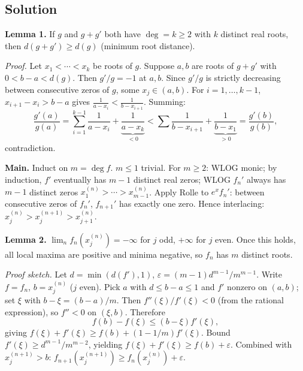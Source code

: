 \documentclass{article}
\begin{document}
\subsection*{Solution}
\textbf{Lemma 1.} If $g$ and $g + g'$ both have $\deg = k \ge 2$ with $k$ distinct real roots, then $d(g + g') \ge d(g)$ (minimum root distance).

\emph{Proof.} Let $x_1 < \cdots < x_k$ be roots of $g$. Suppose $a, b$ are roots of $g + g'$ with $0 < b - a < d(g)$. Then $g'/g = -1$ at $a, b$. Since $g'/g$ is strictly decreasing between consecutive zeros of $g$, some $x_j \in (a, b)$. For $i = 1, \ldots, k-1$, $x_{i+1} - x_i > b - a$ gives $\tfrac{1}{a - x_i} < \tfrac{1}{b - x_{i+1}}$. Summing:
\[
\frac{g'(a)}{g(a)} = \sum_{i=1}^{k-1} \frac{1}{a - x_i} + \underbrace{\frac{1}{a - x_k}}_{< 0} < \sum \frac{1}{b - x_{i+1}} + \underbrace{\frac{1}{b - x_1}}_{> 0} = \frac{g'(b)}{g(b)},
\]
contradiction.

\textbf{Main.} Induct on $m = \deg f$. $m \le 1$ trivial. For $m \ge 2$: WLOG monic; by induction, $f'$ eventually has $m-1$ distinct real zeros; WLOG $f_n'$ always has $m - 1$ distinct zeros $x_1^{(n)} > \cdots > x_{m-1}^{(n)}$. Apply Rolle to $e^x f_n'$: between consecutive zeros of $f_n'$, $f_{n+1}'$ has exactly one zero. Hence interlacing: $x_j^{(n)} > x_j^{(n+1)} > x_{j+1}^{(n)}$.

\textbf{Lemma 2.} $\lim_n f_n(x_j^{(n)}) = -\infty$ for $j$ odd, $+\infty$ for $j$ even. Once this holds, all local maxima are positive and minima negative, so $f_n$ has $m$ distinct roots.

\emph{Proof sketch.} Let $d = \min(d(f'), 1)$, $\varepsilon = (m-1) d^{m-1}/m^{m-1}$. Write $f = f_n$, $b = x_j^{(n)}$ ($j$ even). Pick $a$ with $d \le b - a \le 1$ and $f'$ nonzero on $(a, b)$; set $\xi$ with $b - \xi = (b - a)/m$. Then $f''(\xi)/f'(\xi) < 0$ (from the rational expression), so $f'' < 0$ on $(\xi, b)$. Therefore
\[
f(b) - f(\xi) \le (b - \xi) f'(\xi),
\]
giving $f(\xi) + f'(\xi) \ge f(b) + (1 - 1/m) f'(\xi)$. Bound $f'(\xi) \ge d^{m-1}/m^{m-2}$, yielding $f(\xi) + f'(\xi) \ge f(b) + \varepsilon$. Combined with $x_j^{(n+1)} > b$: $f_{n+1}(x_j^{(n+1)}) \ge f_n(x_j^{(n)}) + \varepsilon$.
\end{document}

